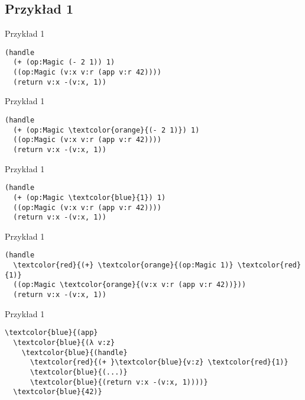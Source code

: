 \documentclass{beamer}
\begin{document}
\subsection{Przykład 1}
\begin{frame}[fragile]{Przykład 1}
  \pause
\begin{Verbatim}[commandchars=\\\{\}]
(handle
  (+ (op:Magic (- 2 1)) 1)
  ((op:Magic (v:x v:r (app v:r 42))))
  (return v:x -(v:x, 1))
\end{Verbatim}
\end{frame}

\begin{frame}[fragile]{Przykład 1}
\begin{Verbatim}[commandchars=\\\{\}]
(handle
  (+ (op:Magic \textcolor{orange}{(- 2 1)}) 1)
  ((op:Magic (v:x v:r (app v:r 42))))
  (return v:x -(v:x, 1))
\end{Verbatim}
\end{frame}

\begin{frame}[fragile]{Przykład 1}
\begin{Verbatim}[commandchars=\\\{\}]
(handle
  (+ (op:Magic \textcolor{blue}{1}) 1)
  ((op:Magic (v:x v:r (app v:r 42))))
  (return v:x -(v:x, 1))
\end{Verbatim}
\end{frame}

\begin{frame}[fragile]{Przykład 1}
\begin{Verbatim}[commandchars=\\\{\}]
(handle
  \textcolor{red}{(+} \textcolor{orange}{(op:Magic 1)} \textcolor{red}{1)}
  ((op:Magic \textcolor{orange}{(v:x v:r (app v:r 42))}))
  (return v:x -(v:x, 1))
\end{Verbatim}
\end{frame}

\begin{frame}[fragile]{Przykład 1}
\begin{Verbatim}[commandchars=\\\{\}]
\textcolor{blue}{(app}
  \textcolor{blue}{(λ v:z}
    \textcolor{blue}{(handle}
      \textcolor{red}{(+ }\textcolor{blue}{v:z} \textcolor{red}{1)}
      \textcolor{blue}{(...)}
      \textcolor{blue}{(return v:x -(v:x, 1))))}
  \textcolor{blue}{42)}
\end{Verbatim}
\end{frame}
\end{document}
